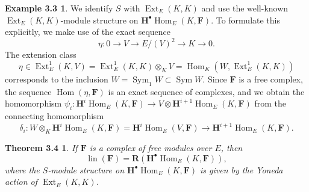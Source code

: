 \documentclass{tran-l}
\newcommand{\myHom}{\operatorname{Hom}}
\newcommand{\Ext}{{\operatorname{Ext}}}
\newcommand{\Sym}{\operatorname{Sym}}
\newcommand{\lin}{\operatorname{lin}}
\newcommand{\FF}{\mathbf{F}}
\newcommand{\myH}{\mathbf{H}}
\newcommand{\RR}{\mathbf{R}}
\theoremstyle{plain}
\newtheorem*{theorem12}{Theorem 3.4}
\theoremstyle{remark}
\theoremstyle{definition}
\newtheorem*{definition1}{Example 3.3}
\begin{document}
\begin{definition1}
We identify $S$ with $\Ext _{E}(K,K)$ and use the well-known
$\Ext _{E}(K,K)$-module structure on $\myH ^{\bullet }\myHom _{E}(K, \FF )$.
To formulate this explicitly,
we make use of the exact sequence
\begin{equation*}\eta : 0\to V\to E/(V)^{2}\to K\to 0.
\end{equation*}
The extension class
\begin{equation*}\eta \in \Ext ^{1}_{E}(K,V)=\Ext ^{1}_{E}(K,K)\otimes _{K} V=\myHom _{K}(W,\Ext ^{1}_{E}(K,K))
\end{equation*}
corresponds to the inclusion $W=\Sym _{1}W\subset \Sym W$.
Since $\FF $ is a free complex, the sequence
$\myHom (\eta ,\FF )$ is an exact sequence of complexes, and we obtain
the homomorphism $\psi _{i}:\myH ^{i} \myHom _{E}(K,\FF )\to V\otimes \myH ^{i+1}\myHom _{E}(K,\FF )$ from the connecting homomorphism
\begin{equation*}\delta _{i}:
W\otimes _{K} \myH ^{i}\myHom _{E}(K,\FF )= \myH ^{i} \myHom _{E}(V, \FF ) \to \myH ^{i+1} \myHom _{E}(K, \FF ).
\end{equation*}
\end{definition1}
\begin{theorem12}
If $\FF $ is a complex of free
modules over $E$,
then
\begin{equation*}\lin (\FF )=\RR (\myH ^{\bullet }\myHom _{E}(K, \FF )),
\end{equation*}
where the $S$-module structure
on
$\myH ^{\bullet }\myHom _{E}(K,\FF )$ is given by the Yoneda action of
$\Ext _{E}(K,K)$.
\end{theorem12}
\end{document}
